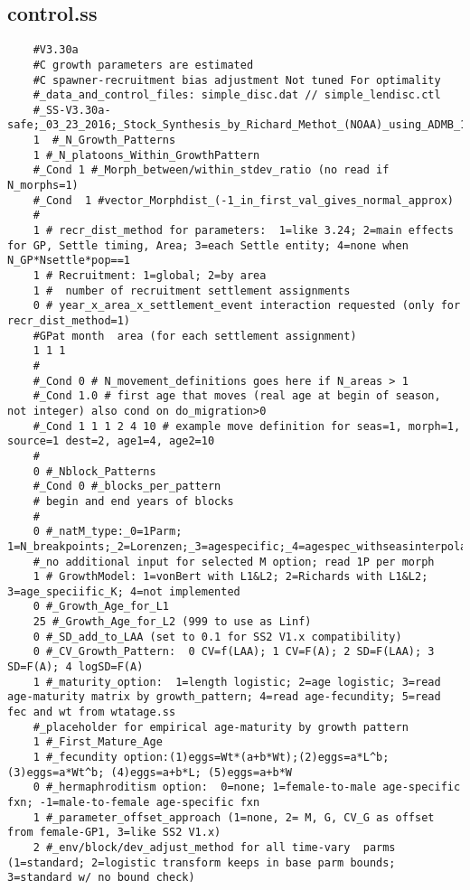 \begin{landscape}
\subsection{control.ss}
\scriptsize{
\begin{verbatim}
	#V3.30a
	#C growth parameters are estimated
	#C spawner-recruitment bias adjustment Not tuned For optimality
	#_data_and_control_files: simple_disc.dat // simple_lendisc.ctl
	#_SS-V3.30a-safe;_03_23_2016;_Stock_Synthesis_by_Richard_Methot_(NOAA)_using_ADMB_11.1
	1  #_N_Growth_Patterns
	1 #_N_platoons_Within_GrowthPattern 
	#_Cond 1 #_Morph_between/within_stdev_ratio (no read if N_morphs=1)
	#_Cond  1 #vector_Morphdist_(-1_in_first_val_gives_normal_approx)
	#
	1 # recr_dist_method for parameters:  1=like 3.24; 2=main effects for GP, Settle timing, Area; 3=each Settle entity; 4=none when N_GP*Nsettle*pop==1
	1 # Recruitment: 1=global; 2=by area
	1 #  number of recruitment settlement assignments 
	0 # year_x_area_x_settlement_event interaction requested (only for recr_dist_method=1)
	#GPat month  area (for each settlement assignment)
	1 1 1
	#
	#_Cond 0 # N_movement_definitions goes here if N_areas > 1
	#_Cond 1.0 # first age that moves (real age at begin of season, not integer) also cond on do_migration>0
	#_Cond 1 1 1 2 4 10 # example move definition for seas=1, morph=1, source=1 dest=2, age1=4, age2=10
	#
	0 #_Nblock_Patterns
	#_Cond 0 #_blocks_per_pattern 
	# begin and end years of blocks
	#
	0 #_natM_type:_0=1Parm; 1=N_breakpoints;_2=Lorenzen;_3=agespecific;_4=agespec_withseasinterpolate
	#_no additional input for selected M option; read 1P per morph
	1 # GrowthModel: 1=vonBert with L1&L2; 2=Richards with L1&L2; 3=age_speciific_K; 4=not implemented
	0 #_Growth_Age_for_L1
	25 #_Growth_Age_for_L2 (999 to use as Linf)
	0 #_SD_add_to_LAA (set to 0.1 for SS2 V1.x compatibility)
	0 #_CV_Growth_Pattern:  0 CV=f(LAA); 1 CV=F(A); 2 SD=F(LAA); 3 SD=F(A); 4 logSD=F(A)
	1 #_maturity_option:  1=length logistic; 2=age logistic; 3=read age-maturity matrix by growth_pattern; 4=read age-fecundity; 5=read fec and wt from wtatage.ss
	#_placeholder for empirical age-maturity by growth pattern
	1 #_First_Mature_Age
	1 #_fecundity option:(1)eggs=Wt*(a+b*Wt);(2)eggs=a*L^b;(3)eggs=a*Wt^b; (4)eggs=a+b*L; (5)eggs=a+b*W
	0 #_hermaphroditism option:  0=none; 1=female-to-male age-specific fxn; -1=male-to-female age-specific fxn
	1 #_parameter_offset_approach (1=none, 2= M, G, CV_G as offset from female-GP1, 3=like SS2 V1.x)
	2 #_env/block/dev_adjust_method for all time-vary  parms (1=standard; 2=logistic transform keeps in base parm bounds; 3=standard w/ no bound check)

\end{verbatim}}
\end{landscape}
